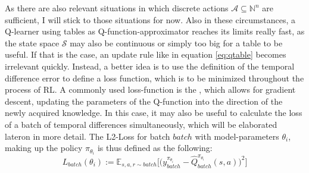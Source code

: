 As there are also relevant situations in which discrete actions $\mathcal{A} \subseteq \mathds{N}^n$ are sufficient, I will stick to those situations for now. Also in these circumstances, a Q-learner using tables as Q-function-approximator reaches its limits really fast, as the state space $\mathcal{S}$ may also be continuous or simply too big for a table to be useful. If that is the case, an update rule like in equation \ref{eq:qtable} becomes irrelevant quickly. Instead, a better idea is to use the definition of the temporal difference error to define a loss function, which is to be minimized throughout the process of RL. A commonly used loss-function is the , which allows for gradient descent, updating the parameters of the Q-function into the direction of the newly acquired knowledge. In this case, it may also be useful to calculate the loss of a batch of temporal differences simultaneously, which will be elaborated lateron in more detail. The L2-Loss for batch $batch$ with model-parameters $\theta_i$, making up the policy $\pi_{\theta_i}$ is thus defined as the following: 
\begin{equation} \label{l2loss}
	L_{batch}(\theta_i) := \mathds{E}_{s,a,r \sim batch} \Big[ \big( y_{batch}^{\pi_{\theta_i}} - \hat{Q}_{batch}^{\pi_{\theta_i}}(s, a)\big)^2 \Big]
\end{equation}







%


